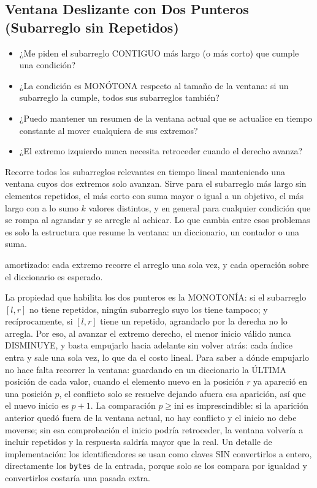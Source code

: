 \subsection{Ventana Deslizante con Dos Punteros (Subarreglo sin Repetidos)}
\label{alg:5-6}


\begin{itemize}
\item ¿Me piden el subarreglo CONTIGUO más largo (o más corto) que cumple una condición?
\item ¿La condición es MONÓTONA respecto al tamaño de la ventana: si un subarreglo la cumple, todos sus subarreglos también?
\item ¿Puedo mantener un resumen de la ventana actual que se actualice en tiempo constante al mover cualquiera de sus extremos?
\item ¿El extremo izquierdo nunca necesita retroceder cuando el derecho avanza?
\end{itemize}

 Recorre todos los subarreglos relevantes en tiempo lineal manteniendo una ventana cuyos dos extremos solo avanzan. Sirve para el subarreglo más largo sin elementos repetidos, el más corto con suma mayor o igual a un objetivo, el más largo con a lo sumo $k$ valores distintos, y en general para cualquier condición que se rompa al agrandar y se arregle al achicar. Lo que cambia entre esos problemas es solo la estructura que resume la ventana: un diccionario, un contador o una suma.

  amortizado: cada extremo recorre el arreglo una sola vez, y cada operación sobre el diccionario es  esperado.

 La propiedad que habilita los dos punteros es la MONOTONÍA: si el subarreglo $[l, r]$ no tiene repetidos, ningún subarreglo suyo los tiene tampoco; y recíprocamente, si $[l, r]$ tiene un repetido, agrandarlo por la derecha no lo arregla. Por eso, al avanzar el extremo derecho, el menor inicio válido nunca DISMINUYE, y basta empujarlo hacia adelante sin volver atrás: cada índice entra y sale una sola vez, lo que da el costo lineal. Para saber a dónde empujarlo no hace falta recorrer la ventana: guardando en un diccionario la ÚLTIMA posición de cada valor, cuando el elemento nuevo en la posición $r$ ya apareció en una posición $p$, el conflicto solo se resuelve dejando afuera esa aparición, así que el nuevo inicio es $p+1$. La comparación $p \ge \text{ini}$ es imprescindible: si la aparición anterior quedó fuera de la ventana actual, no hay conflicto y el inicio no debe moverse; sin esa comprobación el inicio podría retroceder, la ventana volvería a incluir repetidos y la respuesta saldría mayor que la real. Un detalle de implementación: los identificadores se usan como claves SIN convertirlos a entero, directamente los \texttt{bytes} de la entrada, porque solo se los compara por igualdad y convertirlos costaría una pasada extra.

